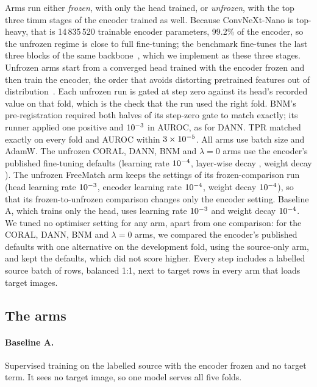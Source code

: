 Arms run either \emph{frozen}, with only the head trained, or \emph{unfrozen}, with the top
three timm stages of the encoder trained as well. Because ConvNeXt-Nano is top-heavy, that is
14\,835\,520 trainable encoder parameters, 99.2\% of the encoder, so the unfrozen regime is
close to full fine-tuning; the benchmark fine-tunes the last three blocks of the same
backbone~\citep{lines2025simstosky}, which we implement as these three stages. Unfrozen arms
start from a converged head trained with the encoder frozen and then train the encoder, the order that avoids distorting pretrained features out of
distribution~\citep{kumar2022lpft}. Each unfrozen run is gated at step zero against its head's
recorded value on that fold, which is the check that the run used the right fold.
BNM's pre-registration required both halves of its step-zero gate to match exactly; its runner
applied one positive and $10^{-3}{}$ in AUROC, as for DANN. TPR matched exactly on
every fold and AUROC within $3 \times 10^{-5}{}$. All arms
use batch size \rwBatch{} and AdamW. The unfrozen CORAL, DANN, BNM and $\lambda=0$ arms use
the encoder's published fine-tuning defaults (learning rate $10^{-4}{}$, layer-wise decay
\rwOptDecay{}, weight decay \rwOptWd{}). The unfrozen FreeMatch arm keeps the settings of its
frozen-comparison run (head learning rate $10^{-3}{}$, encoder learning rate
$10^{-4}{}$, weight decay $10^{-4}{}$), so that its frozen-to-unfrozen comparison changes
only the encoder setting. Baseline A, which trains only the head, uses learning rate
$10^{-3}{}$ and weight decay $10^{-4}{}$. We tuned no optimiser setting for any arm, apart
from one comparison: for the CORAL, DANN, BNM and $\lambda = 0$
arms, we compared the encoder's published defaults with one alternative on the development
fold, using the source-only arm, and kept the defaults, which did not score higher. Every step includes a labelled source batch of
\batchSourceRows{} rows, balanced 1:1, next to \batchTargetRows{} target rows in every arm that
loads target images.

\subsection{The arms}
\label{sec:arms}

\paragraph{Baseline A.} Supervised training on the labelled source with the encoder frozen and
no target term. It sees no target image, so one model serves all five folds.

